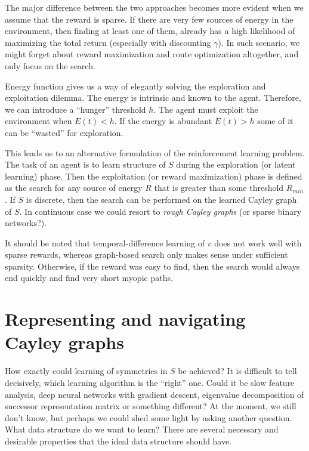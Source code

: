 \documentclass[oneside,english,logo]{amuthesis}
\begin{document}
The major difference between the two approaches becomes more evident when we assume that the reward is sparse. If there are very few sources of energy in the environment, then finding at least one of them, already has a high likelihood of maximizing the total return (especially with discounting $\gamma$). In such scenario, we might forget about reward maximization and route optimization altogether, and only focus on the search. 

Energy function gives us a way of elegantly solving the exploration and exploitation dilemma. The energy is intrinsic and known to the agent. Therefore, we can introduce a ``hunger'' threshold $h$. The agent must exploit the environment when $E(t) < h$. If the energy is abundant $E(t)>h$ some of it can be ``wasted'' for exploration. 

This leads us to an alternative formulation of the reinforcement learning problem.
The task of an agent is to learn structure of $S$ during the exploration (or latent learning) phase. Then the exploitation (or reward maximization) phase is defined as the search for any source of energy $R$ that is greater than some threshold $R_{min}$. If $S$ is discrete, then the search can be performed on the learned Cayley graph of $S$. In continuous case we could resort to \textit{rough Cayley graphs} (or sparse binary networks?). 

It should be noted that temporal-difference learning of $v$ does not work well with sparse rewards, whereas graph-based search only makes sense under sufficient sparsity. Otherwise, if the reward was easy to find, then the search would always end quickly and find very short myopic paths.



\section{Representing and navigating Cayley graphs}
 
How exactly could learning of symmetries in $S$ be achieved? It is difficult to tell decisively, which learning algorithm is the ``right'' one. Could it be slow feature analysis, deep neural networks with gradient descent, eigenvalue decomposition of successor representation matrix or something different?  At the moment, we still don't know, but perhaps we could shed some light by asking another question. What data structure do we want to learn? There are several necessary and desirable properties that the ideal data structure should have.
\end{document}
